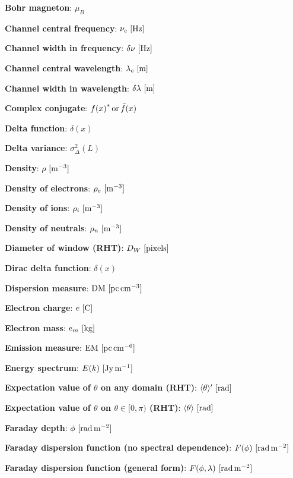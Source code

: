 \documentclass[a4paper,11pt]{article}
\begin{document}
{\noindent}\textbf{Bohr magneton}: $\mu_B$

{\noindent}\textbf{Channel central frequency}: $\nu_c~[{\rm Hz}]$

{\noindent}\textbf{Channel width in frequency}: $\delta\nu~[{\rm Hz}]$

{\noindent}\textbf{Channel central wavelength}: $\lambda_c~[{\rm m}]$

{\noindent}\textbf{Channel width in wavelength}: $\delta\lambda~[{\rm m}]$

{\noindent}\textbf{Complex conjugate}: ${f(x)}^*\,{\rm or}\,\bar{f}(x)$

{\noindent}\textbf{Delta function}: $\delta (x)$

{\noindent}\textbf{Delta variance}: $\sigma_\Delta^2(L)$

{\noindent}\textbf{Density}: $\rho~[{\rm m^{-3}}]$

{\noindent}\textbf{Density of electrons}: $\rho_e~[{\rm m^{-3}}]$

{\noindent}\textbf{Density of ions}: $\rho_i~[{\rm m^{-3}}]$

{\noindent}\textbf{Density of neutrals}: $\rho_n~[{\rm m^{-3}}]$

{\noindent}\textbf{Diameter of window (RHT)}: $D_W ~ [{\rm pixels}]$

{\noindent}\textbf{Dirac delta function}: $\delta(x)$

{\noindent}\textbf{Dispersion measure}: ${\rm DM} ~ [{\rm pc\,cm^{-3}}]$

{\noindent}\textbf{Electron charge}: $e~[{\rm C}]$

{\noindent}\textbf{Electron mass}: $e_m~[{\rm kg}]$

{\noindent}\textbf{Emission measure}: ${\rm EM} ~ [{\rm pc\,cm^{-6}}]$

{\noindent}\textbf{Energy spectrum}: $E(k)~[{\rm Jy\,m^{-1}}]$

{\noindent}\textbf{Expectation value of $\theta$ on any domain (RHT)}: $\langle\theta\rangle' ~ [{\rm rad}]$

{\noindent}\textbf{Expectation value of $\theta$ on $\theta\in[0,\pi)$ (RHT)}: $\langle\theta\rangle ~ [{\rm rad}]$

{\noindent}\textbf{Faraday depth}: $\phi~[{\rm rad\,m^{-2}}]$

{\noindent}\textbf{Faraday dispersion function (no spectral dependence)}: $F(\phi)~[{\rm rad\,m^{-2}}]$

{\noindent}\textbf{Faraday dispersion function (general form)}: $F(\phi,\lambda)~[{\rm rad\,m^{-2}}]$
\end{document}
